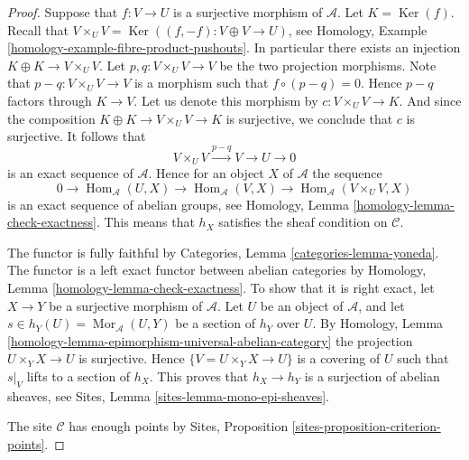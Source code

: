 \documentclass[10pt,a4paper]{amsart}
\theoremstyle{plain}
\theoremstyle{definition}
\theoremstyle{remark}
\numberwithin{equation}{subsection}
\def\Hom{\mathop{\mathrm{Hom}}\nolimits}
\def\Mor{\mathop{\mathrm{Mor}}\nolimits}
\def\Ker{\mathop{\mathrm{Ker}}}
\begin{document}
\begin{proof}
Suppose that $f : V \to U$ is a surjective morphism of $\mathcal{A}$.
Let $K = \Ker(f)$. Recall that
$V \times_U V = \Ker((f, -f) : V \oplus V \to U)$, see
Homology, Example \ref{homology-example-fibre-product-pushouts}.
In particular there exists an injection $K \oplus K \to V \times_U V$.
Let $p, q : V \times_U V \to V$ be the two projection morphisms.
Note that $p - q : V \times_U V \to V$ is a morphism such that
$f \circ (p  - q) = 0$. Hence $p - q$ factors through $K \to V$.
Let us denote this morphism by $c : V \times_U V \to K$.
And since the composition $K \oplus K \to V \times_U V \to K$
is surjective, we conclude that $c$ is surjective. It follows that
$$
V \times_U V \xrightarrow{p - q} V \to U \to 0
$$
is an exact sequence of $\mathcal{A}$.
Hence for an object $X$ of $\mathcal{A}$ the sequence
$$
0 \to
\Hom_\mathcal{A}(U, X) \to
\Hom_\mathcal{A}(V, X) \to
\Hom_\mathcal{A}(V \times_U V, X)
$$
is an exact sequence of abelian groups, see
Homology, Lemma \ref{homology-lemma-check-exactness}.
This means that $h_X$ satisfies the sheaf condition
on $\mathcal{C}$.

\medskip\noindent
The functor is fully faithful by
Categories, Lemma \ref{categories-lemma-yoneda}.
The functor is a left exact functor between abelian categories by
Homology, Lemma \ref{homology-lemma-check-exactness}.
To show that it is right exact, let $X \to Y$ be a surjective morphism
of $\mathcal{A}$. Let $U$ be an object of $\mathcal{A}$, and let
$s \in h_Y(U) = \Mor_\mathcal{A}(U, Y)$ be a section of $h_Y$
over $U$. By
Homology, Lemma \ref{homology-lemma-epimorphism-universal-abelian-category}
the projection $U \times_Y X \to U$ is surjective.
Hence $\{V = U \times_Y X \to U\}$ is a covering of $U$ such that
$s|_V$ lifts to a section of $h_X$. This proves that
$h_X \to h_Y$ is a surjection of abelian sheaves, see
Sites, Lemma \ref{sites-lemma-mono-epi-sheaves}.

\medskip\noindent
The site $\mathcal{C}$ has enough points by
Sites, Proposition \ref{sites-proposition-criterion-points}.
\end{proof}
\end{document}
